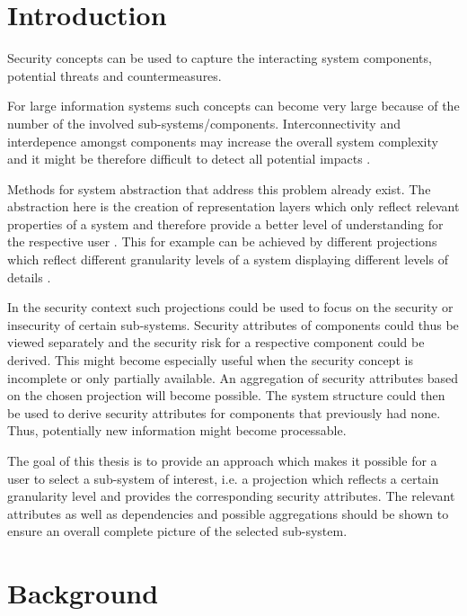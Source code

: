 \section{Introduction}

Security concepts can be used to capture the interacting system components, potential threats and countermeasures. 

For large information systems such concepts can become very large because of the number of the involved sub-systems/components. Interconnectivity and interdepence amongst components may increase the overall system complexity and it might be therefore difficult to detect all potential impacts \cite{branagan}.

Methods for system abstraction that address this problem already exist. The abstraction here is the creation of representation layers which only reflect relevant properties of a system and therefore provide a better level of understanding for the respective user \cite{pohl}. This for example can be achieved by different projections which reflect different granularity levels of a system displaying different levels of details \cite{thyssen2010system}.

In the security context such projections could be used to focus on the security or insecurity of certain sub-systems. Security attributes of components could thus be viewed separately and the security risk for a respective component could be derived. This might become especially useful when the security concept is incomplete or only partially available. An aggregation of security attributes based on the chosen projection will become possible. The system structure could then be used to derive security attributes for components that previously had none. Thus, potentially new information might become processable.

The goal of this thesis is to provide an approach which makes it possible for a user to select a sub-system of interest, i.e. a projection which reflects a certain granularity level and provides the corresponding security attributes. The relevant attributes as well as dependencies and possible aggregations should be shown to ensure an overall complete picture of the selected sub-system. 


\section{Background}